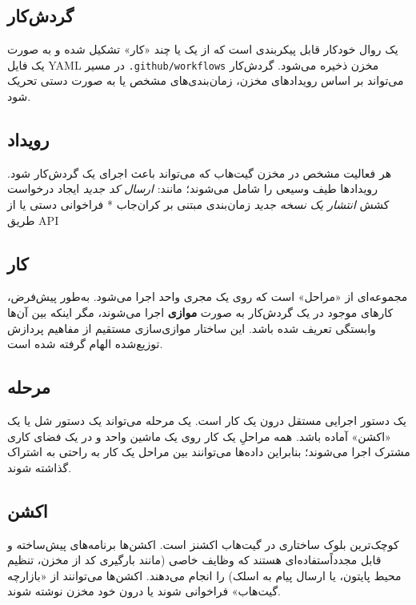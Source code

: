 \documentclass[12pt,a4paper,openany]{book}
\begin{document}
\subsection{گردش‌کار }

یک روال خودکار قابل پیکربندی است که از یک یا چند «کار» تشکیل شده و به صورت یک فایل YAML در مسیر \texttt{.github/workflows} مخزن ذخیره می‌شود. گردش‌کار می‌تواند بر اساس رویدادهای مخزن، زمان‌بندی‌های مشخص یا به صورت دستی تحریک  شود.

\subsection{رویداد }

هر فعالیت مشخص در مخزن گیت‌هاب که می‌تواند باعث اجرای یک گردش‌کار شود. رویدادها طیف وسیعی را شامل می‌شوند؛ مانند: \textit{ ارسال کد جدید  } ایجاد درخواست کشش  \textit{ انتشار یک نسخه جدید  } زمان‌بندی مبتنی بر کران‌جاب  * فراخوانی دستی یا از طریق API 

\subsection{کار }

مجموعه‌ای از «مراحل»  است که روی یک مجری  واحد اجرا می‌شود. به‌طور پیش‌فرض، کارهای موجود در یک گردش‌کار به صورت \textbf{موازی} اجرا می‌شوند، مگر اینکه بین آن‌ها وابستگی  تعریف شده باشد. این ساختار موازی‌سازی مستقیم از مفاهیم پردازش توزیع‌شده الهام گرفته شده است.

\subsection{مرحله }

یک دستور اجرایی مستقل درون یک کار است. یک مرحله می‌تواند یک دستور شل  یا یک «اکشن» آماده باشد. همه مراحلِ یک کار روی یک ماشین واحد و در یک فضای کاری مشترک اجرا می‌شوند؛ بنابراین داده‌ها می‌توانند بین مراحل یک کار به راحتی به اشتراک گذاشته شوند.

\subsection{اکشن }

کوچک‌ترین بلوک ساختاری در گیت‌هاب اکشنز است. اکشن‌ها برنامه‌های پیش‌ساخته و قابل مجدداًستفاده‌ای هستند که وظایف خاصی (مانند بارگیری کد از مخزن، تنظیم محیط پایتون، یا ارسال پیام به اسلک) را انجام می‌دهند. اکشن‌ها می‌توانند از «بازارچه گیت‌هاب»  فراخوانی شوند یا درون خود مخزن نوشته شوند.
\end{document}
